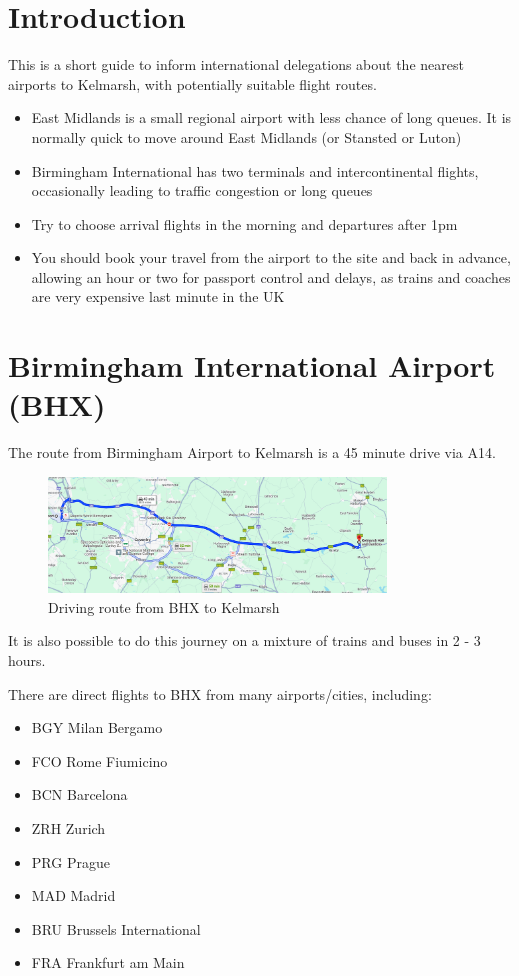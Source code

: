 \documentclass[a4paper, 11pt]{article}
\begin{document}
\makedocumenttitlepage

\section{Introduction}
This is a short guide to inform international delegations about the nearest airports to Kelmarsh, with potentially suitable flight routes.
\begin{itemize}
    \item East Midlands is a small regional airport with less chance of long queues. It is normally quick to move around East Midlands (or Stansted or Luton) 
    \item Birmingham International has two terminals and intercontinental flights, occasionally leading to traffic congestion or long queues
    \item Try to choose arrival flights in the morning and departures after 1pm
    \item You should book your travel from the airport to the site and back in advance, allowing an hour or two for passport control and delays, as trains and coaches are very expensive last minute in the UK
\end{itemize}

\section{Birmingham International Airport (BHX)}
The route from Birmingham Airport to Kelmarsh is a 45 minute drive via A14.

\begin{figure}[H]
    \centering
    \includegraphics[width=0.8\textwidth]{assets/bhx.png}
    \caption{Driving route from BHX to Kelmarsh}
\end{figure}

It is also possible to do this journey on a mixture of trains and buses in 2 - 3 hours.

There are direct flights to BHX from many airports/cities, including:
\begin{multicols}{2}
    \begin{itemize}
        \item BGY Milan Bergamo
        \item FCO Rome Fiumicino
        \item BCN Barcelona
        \item ZRH Zurich 
        \item PRG Prague
        \item MAD Madrid
        \item BRU Brussels International
        \item FRA Frankfurt am Main
    \end{itemize}
\end{multicols}
\end{document}
